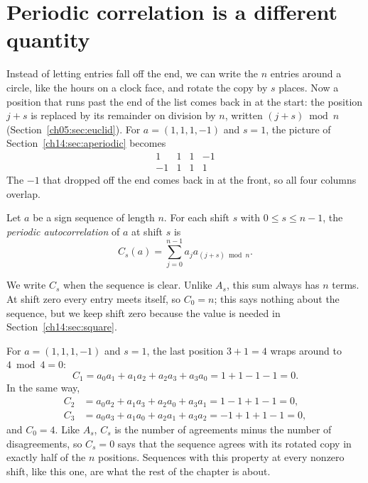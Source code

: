 \section{Periodic correlation is a different quantity}\label{ch14:sec:periodic}
Instead of letting entries fall off the end, we can write the $n$ entries around a circle, like the hours on a clock face, and rotate the copy by $s$ places. Now a position that runs past the end of the list comes back in at the start: the position $j+s$ is replaced by its remainder on division by $n$, written $(j+s)\bmod n$ (Section~\ref{ch05:sec:euclid}). For $a=(1,1,1,-1)$ and $s=1$, the picture of Section~\ref{ch14:sec:aperiodic} becomes
\[
\begin{array}{rrrr}
1&1&1&-1\\
-1&1&1&1
\end{array}
\]
The $-1$ that dropped off the end comes back in at the front, so all four columns overlap.

\par\noindent\begin{minipage}{\linewidth}
\begin{definition}\label{ch14:def:periodic}
Let $a$ be a sign sequence of length $n$. For each shift $s$ with $0\le s\le n-1$, the \emph{periodic autocorrelation} of $a$ at shift $s$ is
\[
C_s(a)=\sum_{j=0}^{n-1}a_j a_{(j+s)\bmod n}.
\]
\end{definition}
\end{minipage}\par

We write $C_s$ when the sequence is clear. Unlike $A_s$, this sum always has $n$ terms. At shift zero every entry meets itself, so $C_0=n$; this says nothing about the sequence, but we keep shift zero because the value is needed in Section~\ref{ch14:sec:square}.

For $a=(1,1,1,-1)$ and $s=1$, the last position $3+1=4$ wraps around to $4\bmod4=0$:
\[
C_1=a_0a_1+a_1a_2+a_2a_3+a_3a_0=1+1-1-1=0.
\]
In the same way,
\begin{align*}
C_2&=a_0a_2+a_1a_3+a_2a_0+a_3a_1=1-1+1-1=0,\\
C_3&=a_0a_3+a_1a_0+a_2a_1+a_3a_2=-1+1+1-1=0,
\end{align*}
and $C_0=4$. Like $A_s$, $C_s$ is the number of agreements minus the number of disagreements, so $C_s=0$ says that the sequence agrees with its rotated copy in exactly half of the $n$ positions. Sequences with this property at every nonzero shift, like this one, are what the rest of the chapter is about.

